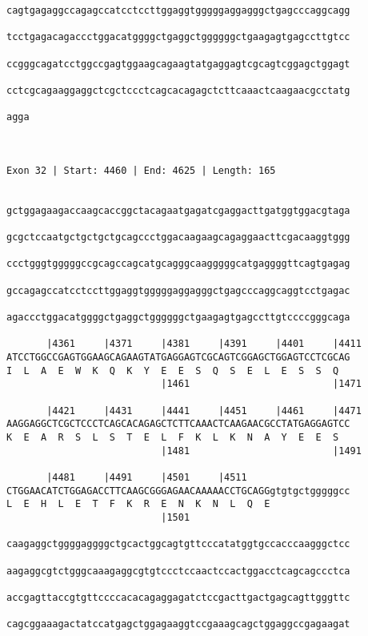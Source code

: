 \documentclass{article}
\begin{document}
\begin{Verbatim}
cagtgagaggccagagccatcctccttggaggtgggggaggagggctgagcccaggcagg

tcctgagacagaccctggacatggggctgaggctggggggctgaagagtgagccttgtcc

ccgggcagatcctggccgagtggaagcagaagtatgaggagtcgcagtcggagctggagt

cctcgcagaaggaggctcgctccctcagcacagagctcttcaaactcaagaacgcctatg

agga
    

 
Exon 32 | Start: 4460 | End: 4625 | Length: 165


gctggagaagaccaagcaccggctacagaatgagatcgaggacttgatggtggacgtaga

gcgctccaatgctgctgctgcagccctggacaagaagcagaggaacttcgacaaggtggg

ccctgggtgggggccgcagccagcatgcagggcaagggggcatgaggggttcagtgagag

gccagagccatcctccttggaggtgggggaggagggctgagcccaggcaggtcctgagac

agaccctggacatggggctgaggctggggggctgaagagtgagccttgtccccgggcaga

       |4361     |4371     |4381     |4391     |4401     |4411
ATCCTGGCCGAGTGGAAGCAGAAGTATGAGGAGTCGCAGTCGGAGCTGGAGTCCTCGCAG
I  L  A  E  W  K  Q  K  Y  E  E  S  Q  S  E  L  E  S  S  Q  
                           |1461                         |1471
  
       |4421     |4431     |4441     |4451     |4461     |4471
AAGGAGGCTCGCTCCCTCAGCACAGAGCTCTTCAAACTCAAGAACGCCTATGAGGAGTCC
K  E  A  R  S  L  S  T  E  L  F  K  L  K  N  A  Y  E  E  S  
                           |1481                         |1491
  
       |4481     |4491     |4501     |4511                  
CTGGAACATCTGGAGACCTTCAAGCGGGAGAACAAAAACCTGCAGGgtgtgctgggggcc
L  E  H  L  E  T  F  K  R  E  N  K  N  L  Q  E              
                           |1501                            
  
caagaggctggggaggggctgcactggcagtgttcccatatggtgccacccaagggctcc
                                                            
aagaggcgtctgggcaaagaggcgtgtccctccaactccactggacctcagcagccctca
                                                            
accgagttaccgtgttccccacacagaggagatctccgacttgactgagcagttgggttc
                                                            
cagcggaaagactatccatgagctggagaaggtccgaaagcagctggaggccgagaagat
                                                            

\end{Verbatim}
\end{document}
